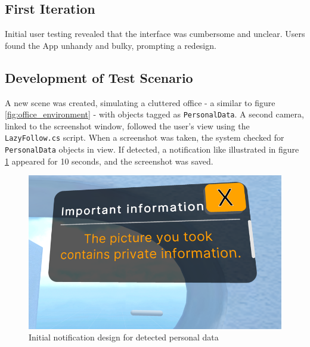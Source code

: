 \documentclass[sigconf,authordraft]{acmart}
\begin{document}
\subsection{First Iteration}
Initial user testing revealed that the interface was cumbersome and unclear. Users found the App unhandy and bulky, prompting a redesign.

\subsection{Development of Test Scenario}
A new scene was created, simulating a cluttered office - a similar to figure \ref{fig:office_environment} - with objects tagged as \texttt{PersonalData}. A second camera, linked to the screenshot window, followed the user’s view using the \texttt{LazyFollow.cs} script. When a screenshot was taken, the system checked for \texttt{PersonalData} objects in view. If detected, a notification like illustrated in figure \ref{fig:initial_notification} appeared for 10 seconds, and the screenshot was saved.

\begin{figure}[h]
  \centering
  \includegraphics[width=0.7\linewidth]{First version of Notification.png}
  \caption{Initial notification design for detected personal data}
  \label{fig:initial_notification}
\end{figure}
\end{document}
